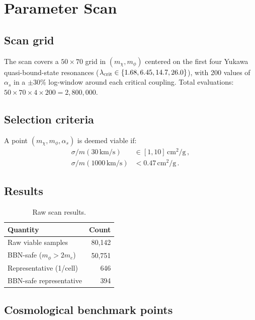 \documentclass[aps,prd,twocolumn,superscriptaddress,nofootinbib]{revtex4-2}
\newcommand{\sigmam}{\sigma/m}
\newcommand{\kms}{\,\text{km/s}}
\newcommand{\cmg}{\,\text{cm}^2/\text{g}}
\newcommand{\mchi}{m_\chi}
\newcommand{\mphi}{m_\phi}
\newcommand{\lam}{\lambda}
\begin{document}
\section{Parameter Scan}\label{sec:scan}

\subsection{Scan grid}\label{sec:grid}

The scan covers a $50\times 70$ grid in $(\mchi,\mphi)$ centered on
the first four Yukawa quasi-bound-state resonances
($\lam_{\rm crit}\in\{1.68,6.45,14.7,26.0\}$), with 200 values
of~$\alpha_s$ in a $\pm30\%$ log-window around each critical coupling.
Total evaluations: $50\times 70\times 4\times 200=2{,}800{,}000$.

\subsection{Selection criteria}\label{sec:cuts}

A point $(\mchi,\mphi,\alpha_s)$ is deemed viable if:
\begin{align}
  \sigmam(30\kms) &\in [1,10]\cmg\,,\label{eq:cut_dwarf}\\
  \sigmam(1000\kms) &< 0.47\cmg\,.\label{eq:cut_cluster}
\end{align}

\subsection{Results}\label{sec:scan_results}

\begin{table}[h]
\centering
\caption{Raw scan results.}
\label{tab:scan_results}
\begin{tabular}{lr}
\toprule
Quantity & Count \\
\midrule
Raw viable samples       & 80,142 \\
BBN-safe ($\mphi>2m_e$)  & 50,751 \\
Representative (1/cell)  & 646 \\
BBN-safe representative  & 394 \\
\bottomrule
\end{tabular}
\end{table}

\subsection{Cosmological benchmark points}\label{sec:relic_bps}
\end{document}
